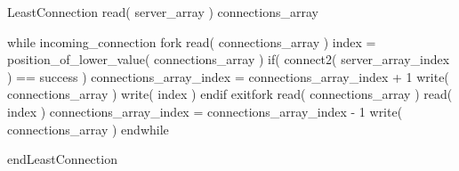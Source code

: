 
\begin{code}

LeastConnection
	read( server_array )
	connections_array
	
	while incoming_connection
		fork
			read( connections_array )
			index = position_of_lower_value( connections_array )
			if( connect2( server_array_{index} ) == success )
				connections_array_{index} = connections_array_{index} + 1
				write( connections_array )
				write( index )
			endif
		exitfork
		read( connections_array )
		read( index )
		connections_array_{index} = connections_array_{index} - 1
		write( connections_array )
	endwhile

endLeastConnection

\end{code}